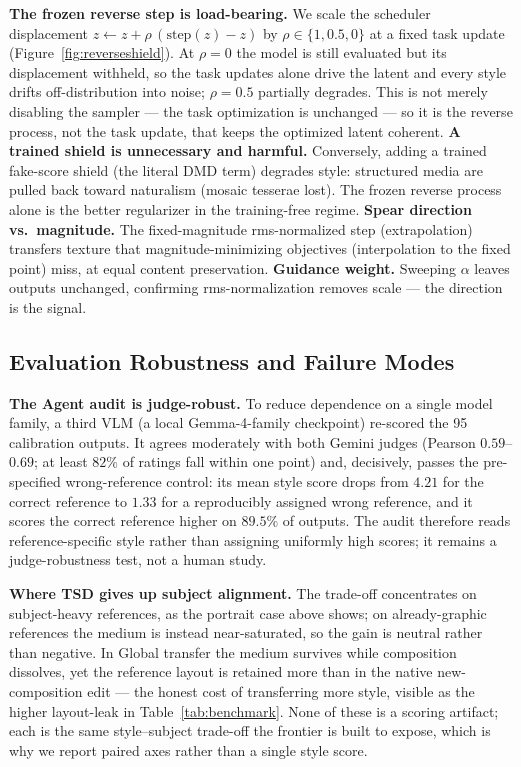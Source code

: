 \documentclass[letterpaper]{article} %
\begin{document}
\textbf{The frozen reverse step is load-bearing.} We scale the scheduler
displacement $z\!\leftarrow\!z+\rho\,(\mathrm{step}(z)-z)$ by $\rho\in\{1,0.5,0\}$
at a fixed task update (Figure~\ref{fig:reverseshield}). At $\rho=0$ the model is
still evaluated but its displacement withheld, so the task updates alone drive
the latent and every style drifts off-distribution into noise; $\rho=0.5$
partially degrades. This is not merely disabling the sampler --- the task
optimization is unchanged --- so it is the reverse process, not the task update,
that keeps the optimized latent coherent. \textbf{A trained shield is
unnecessary and harmful.} Conversely,
adding a trained fake-score shield (the literal DMD term) degrades style:
structured media are pulled back toward naturalism (mosaic tesserae lost). The
frozen reverse process alone is the better regularizer in the training-free
regime. \textbf{Spear direction vs.\ magnitude.} The fixed-magnitude
rms-normalized step (extrapolation) transfers texture that magnitude-minimizing
objectives (interpolation to the fixed point) miss, at equal content
preservation. \textbf{Guidance weight.} Sweeping $\alpha$ leaves outputs
unchanged, confirming rms-normalization removes scale --- the direction is the
signal.

\subsection{Evaluation Robustness and Failure Modes}

\textbf{The Agent audit is judge-robust.} To reduce dependence on a single model
family, a third VLM (a local Gemma-4-family checkpoint) re-scored the 95
calibration outputs. It agrees moderately with both Gemini judges (Pearson
$0.59$--$0.69$; at least $82\%$ of ratings fall within one point) and, decisively,
passes the pre-specified wrong-reference control: its mean style score drops from
$4.21$ for the correct reference to $1.33$ for a reproducibly assigned wrong
reference, and it scores the correct reference higher on $89.5\%$ of outputs. The
audit therefore reads reference-specific style rather than assigning uniformly
high scores; it remains a judge-robustness test, not a human study.

\textbf{Where TSD gives up subject alignment.} The trade-off concentrates on
subject-heavy references, as the portrait case above shows; on already-graphic
references the medium is instead near-saturated, so the gain is neutral rather
than negative. In Global transfer the medium survives while composition
dissolves, yet the reference layout is retained more than in the native
new-composition edit --- the honest cost of transferring more style, visible as
the higher layout-leak in Table~\ref{tab:benchmark}. None of these is a scoring artifact; each is the same
style--subject trade-off the frontier is built to expose, which is why we report
paired axes rather than a single style score.
\end{document}
